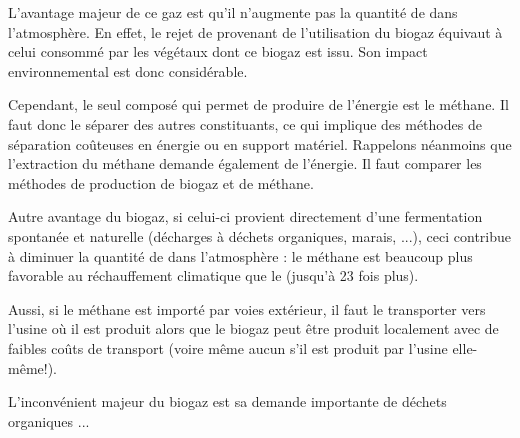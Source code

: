 \documentclass[10pt,a4paper]{article}
\begin{document}
L'avantage majeur de ce gaz est qu'il n'augmente pas la quantité de  dans l'atmosphère. En effet, le rejet de  provenant de l'utilisation du biogaz équivaut à celui consommé par les végétaux dont ce biogaz est issu. Son impact environnemental est donc considérable.

Cependant, le seul composé qui permet de produire de l'énergie est le méthane. Il faut donc le séparer des autres constituants, ce qui implique des méthodes de séparation coûteuses en énergie ou en support matériel. Rappelons néanmoins que l'extraction du méthane demande également de l'énergie. Il faut comparer les méthodes de production de biogaz et de méthane.

Autre avantage du biogaz, si celui-ci provient directement d'une fermentation spontanée et naturelle (décharges à déchets organiques, marais, ...), ceci contribue à diminuer la quantité de  dans l'atmosphère : le méthane est beaucoup plus favorable au réchauffement climatique que le  (jusqu'à 23 fois plus).

Aussi, si le méthane est importé par voies extérieur, il faut le transporter vers l'usine où il est produit alors que le biogaz peut être produit localement avec de faibles coûts de transport (voire même aucun s'il est produit par l'usine elle-même!).

L'inconvénient majeur du biogaz est sa demande importante de déchets organiques ...
\end{document}
